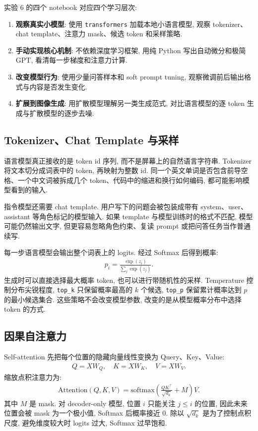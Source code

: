 \documentclass{../../nndlcourse}
\begin{document}
实验 6 的四个 notebook 对应四个学习层次:
\begin{enumerate}
    \item \textbf{观察真实小模型}: 使用 \texttt{transformers} 加载本地小语言模型, 观察 tokenizer、chat template、注意力 mask、候选 token 和采样策略.
    \item \textbf{手动实现核心机制}: 不依赖深度学习框架, 用纯 Python 写出自动微分和极简 GPT, 看清每一步梯度和注意力计算.
    \item \textbf{改变模型行为}: 使用少量问答样本和 soft prompt tuning, 观察微调前后输出格式与内容是否发生变化.
    \item \textbf{扩展到图像生成}: 用扩散模型理解另一类生成范式, 对比语言模型的逐 token 生成与扩散模型的逐步去噪.
\end{enumerate}

\subsection{Tokenizer、Chat Template 与采样}

语言模型真正接收的是 token id 序列, 而不是屏幕上的自然语言字符串. Tokenizer 将文本切分成词表中的 token, 再映射为整数 id. 同一个英文单词是否包含前导空格、一个中文词被拆成几个 token、代码中的缩进和换行如何编码, 都可能影响模型看到的输入.

指令模型还需要 chat template. 用户写下的问题会被包装成带有 system、user、assistant 等角色标记的模型输入. 如果 template 与模型训练时的格式不匹配, 模型可能仍然输出文字, 但更容易忽略角色约束、复读 prompt 或把问答任务当作普通续写.

每一步语言模型会输出整个词表上的 logits. 经过 Softmax 后得到概率:
\begin{align}
    p_i = \frac{\exp(z_i)}{\sum_j \exp(z_j)}.
\end{align}
生成时可以直接选择最大概率 token, 也可以进行带随机性的采样. Temperature 控制分布尖锐程度, \texttt{top\_k} 只保留概率最高的 $k$ 个候选, \texttt{top\_p} 保留累计概率达到 $p$ 的最小候选集合. 这些策略不会改变模型参数, 改变的是从模型概率分布中选择 token 的方式.

\subsection{因果自注意力}

Self-attention 先把每个位置的隐藏向量线性变换为 Query、Key、Value:
\begin{align}
    Q=XW_Q,\quad K=XW_K,\quad V=XW_V.
\end{align}
缩放点积注意力为:
\begin{align}
    \mathrm{Attention}(Q,K,V)
    =
    \mathrm{softmax}\left(
    \frac{QK^\top}{\sqrt{d_k}} + M
    \right)V.
\end{align}
其中 $M$ 是 mask. 对 decoder-only 模型, 位置 $i$ 只能关注 $j\le i$ 的位置, 因此未来位置会被 mask 为一个极小值, Softmax 后概率接近 0. 除以 $\sqrt{d_k}$ 是为了控制点积尺度, 避免维度较大时 logits 过大, Softmax 过早饱和.
\end{document}
